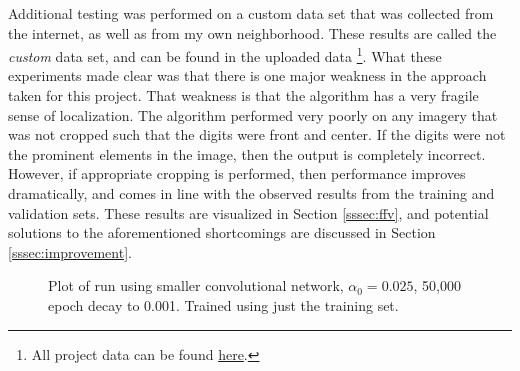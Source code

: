 \documentclass[12pt]{article}
\begin{document}
Additional testing was performed on a custom data set that was collected from the internet, as well as from my own neighborhood.
These results are called the \textit{custom} data set, and can be found in the uploaded data \footnote{All project data can be found \href{https://drive.google.com/open?id=0B918sU9DDf8DTElNWGhwN1pTTXM}{here}.}.
What these experiments made clear was that there is one major weakness in the approach taken for this project.
That weakness is that the algorithm has a very fragile sense of localization.
The algorithm performed very poorly on any imagery that was not cropped such that the digits were front and center.
If the digits were not the prominent elements in the image, then the output is completely incorrect.
However, if appropriate cropping is performed, then performance improves dramatically, and comes in line with the observed results from the training and validation sets.
These results are visualized in Section \ref{sssec:ffv}, and potential solutions to the aforementioned shortcomings are discussed in Section \ref{sssec:improvement}.

\begin{figure}
\centering
{}\hfill
{}\hfill
\caption{Plot of run using smaller convolutional network, $\alpha_0 = 0.025$, 50,000 epoch decay to 0.001. Trained using just the training set.}
\label{fig:final_lessdata}
\end{figure}
\end{document}
